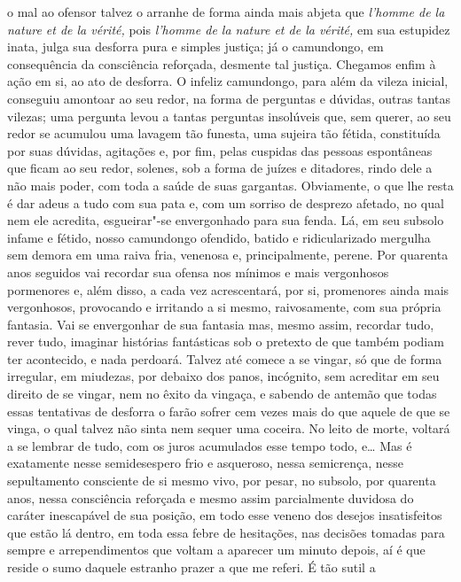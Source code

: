 o mal ao ofensor talvez o arranhe de forma ainda mais abjeta que
\emph{l'homme de la nature et de la vérité,} pois \emph{l'homme de la
nature et de la vérité,} em sua estupidez inata, julga sua desforra pura
e simples justiça; já o camundongo, em consequência da consciência
reforçada, desmente tal justiça. Chegamos enfim à ação em si, ao ato de
desforra. O infeliz camundongo, para além da vileza inicial, conseguiu
amontoar ao seu redor, na forma de perguntas e dúvidas, outras tantas
vilezas; uma pergunta levou a tantas perguntas insolúveis que, sem
querer, ao seu redor se acumulou uma lavagem tão funesta, uma sujeira
tão fétida, constituída por suas dúvidas, agitações e, por fim, pelas
cuspidas das pessoas espontâneas que ficam ao seu redor, solenes, sob a
forma de juízes e ditadores, rindo dele a não mais poder, com toda a
saúde de suas gargantas. Obviamente, o que lhe resta é dar adeus a tudo
com sua pata e, com um sorriso de desprezo afetado, no qual nem ele
acredita, esgueirar"-se envergonhado para sua fenda. Lá, em seu subsolo
infame e fétido, nosso camundongo ofendido, batido e ridicularizado
mergulha sem demora em uma raiva fria, venenosa e, principalmente,
perene. Por quarenta anos seguidos vai recordar sua ofensa nos mínimos e
mais vergonhosos pormenores e, além disso, a cada vez acrescentará, por
si, promenores ainda mais vergonhosos, provocando e irritando a si
mesmo, raivosamente, com sua própria fantasia. Vai se envergonhar de sua
fantasia mas, mesmo assim, recordar tudo, rever tudo, imaginar histórias
fantásticas sob o pretexto de que também podiam ter acontecido, e nada
perdoará. Talvez até comece a se vingar, só que de forma irregular, em
miudezas, por debaixo dos panos, incógnito, sem acreditar em seu direito
de se vingar, nem no êxito da vingaça, e sabendo de antemão que todas
essas tentativas de desforra o farão sofrer cem vezes mais do que aquele
de que se vinga, o qual talvez não sinta nem sequer uma coceira. No
leito de morte, voltará a se lembrar de tudo, com os juros acumulados
esse tempo todo, e\ldots{} Mas é exatamente nesse semidesespero frio e
asqueroso, nessa semicrença, nesse sepultamento consciente de si mesmo
vivo, por pesar, no subsolo, por quarenta anos, nessa consciência
reforçada e mesmo assim parcialmente duvidosa do caráter inescapável de
sua posição, em todo esse veneno dos desejos insatisfeitos que estão lá
dentro, em toda essa febre de hesitações, nas decisões tomadas para
sempre e arrependimentos que voltam a aparecer um minuto depois, aí é
que reside o sumo daquele estranho prazer a que me referi. É tão sutil a
